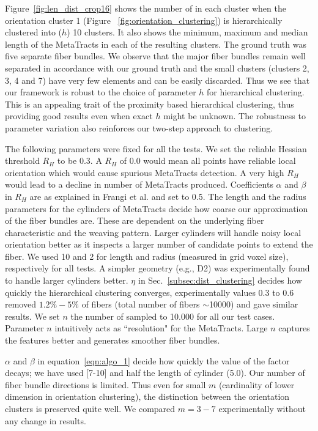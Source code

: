 Figure~\ref{fig:len_dist_crop16} shows the number of \mt in each cluster when the orientation cluster 1 (Figure ~\ref{fig:orientation_clustering}) is hierarchically clustered into ($h$) 10 clusters. It also shows the minimum, maximum and median length of the MetaTracts in each of the resulting clusters. The ground truth was five separate fiber bundles. We observe that the major fiber bundles remain well separated in accordance with our ground truth and the small clusters (clusters 2, 3, 4 and 7) have very few elements and can be easily discarded. Thus we see that our framework is robust to the choice of parameter $h$ for hierarchical clustering. This is an appealing trait of the proximity based hierarchical clustering, thus providing good results even when exact $h$ might be unknown. The robustness to parameter variation also reinforces our two-step approach to clustering. 


The following parameters were fixed for all the tests. We set the reliable Hessian threshold $R_{H}$ to be 0.3. A $R_{H}$ of 0.0 would mean all points have reliable local orientation which would cause spurious MetaTracts detection. A very high $ R_{H}$ would lead to a decline in number of MetaTracts produced. Coefficients $\alpha$ and $\beta$ in $R_{H}$ are as explained in Frangi et al. \cite{Frangi1998} and set to 0.5. The length and the radius parameters for the cylinders of MetaTracts decide how coarse our approximation of the fiber bundles are. These are dependent on the underlying fiber characteristic and the weaving pattern. Larger cylinders will handle noisy local orientation better as it inspects a larger number of candidate points to extend the fiber. We used 10 and 2 for length and radius (measured in grid voxel size), respectively for all tests.  
A simpler geometry (e.g., D2) was experimentally found to handle larger cylinders better. $\eta$ in Sec.~\ref{subsec:dist_clustering} decides how quickly the hierarchical clustering converges, experimentally values 0.3 to 0.6 removed $1.2\% - 5\%$ of fibers (total number of fibers $\sim$10000) and gave similar results. We set $n$ the number of sampled \mt to 10.000 for all our test cases. Parameter $n$ intuitively acts as ``resolution" for the MetaTracts. Large $n$ captures the features better and generates smoother fiber bundles. 

$\alpha$ and $\beta$ in equation~\ref{eqn:algo_1} decide how quickly the value of the factor decays; we have used [7-10] and half the length of cylinder (5.0). Our number of fiber bundle directions is limited. Thus even for small $m$ (cardinality of lower dimension in orientation clustering), the distinction between the orientation clusters is preserved quite well. We compared $m=3-7$ experimentally without any change in results. 
